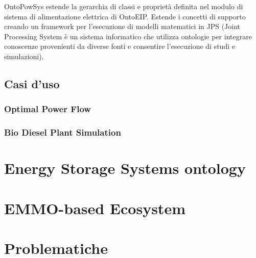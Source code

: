 OntoPowSys estende la gerarchia di classi e proprietà definita nel modulo di
sistema di alimentazione elettrica di OntoEIP. Estende
i concetti di supporto creando un framework per l'esecuzione di modelli
matematici in JPS (Joint Processing System è un sistema informatico che
utilizza ontologie per integrare conoscenze provenienti da diverse fonti e
consentire l'esecuzione di studi e simulazioni).

\subsection{Casi d'uso}

\subsubsection{Optimal Power Flow}

\subsubsection{Bio Diesel Plant Simulation}

\section{Energy Storage Systems ontology}

\section{EMMO-based Ecosystem}

\section{Problematiche}